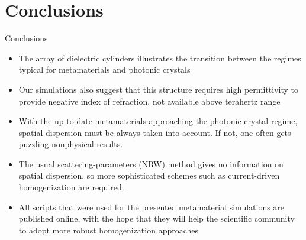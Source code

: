 \documentclass[t]{beamer} \usepackage[english]{babel} \usepackage[utf8]{inputenc} \usetheme{Frankfurt} %
\begin{document}
\section{Conclusions}


\begin{frame}{Conclusions}%
\begin{itemize}
\item The array of dielectric cylinders illustrates the transition between the regimes typical for metamaterials and photonic crystals

\item Our simulations also suggest that this structure requires high permittivity to provide negative index of refraction, not available above terahertz range

\item With the up-to-date metamaterials approaching the photonic-crystal regime, spatial dispersion must be always taken into account.
If not, one often gets puzzling nonphysical results.

\item The usual scattering-parameters (NRW) method gives no information on spatial dispersion, so more sophisticated schemes such as current-driven homogenization are required.

\item All scripts that were used for the presented metamaterial simulations are published online, with the hope that they will help the scientific community to adopt more robust homogenization approaches

\end{itemize}

\end{frame} %
\end{document}

